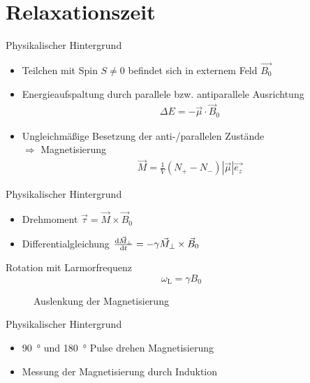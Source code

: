
\thispagestyle{empty}
\frame{\titlepage}


\section{Relaxationszeit}
\begin{frame}{Physikalischer Hintergrund}
	\begin{itemize}
	\item Teilchen mit Spin $S\neq 0$ befindet sich in externem Feld $\vec{B_{0}}$
	\item Energieaufspaltung durch parallele bzw. antiparallele Ausrichtung
		\begin{align*}
		\Delta E = -\vec{\mu}\cdot\vec{B}_0
		\end{align*}
	\item Ungleichmäßige Besetzung der anti-/parallelen Zustände\\
	 $\Rightarrow$ Magnetisierung 
		\begin{align*}
		\vec{M}=\frac{1}{V}(N_{+}-N_{-})|\vec{\mu}|\vec{e_{z}}
		\end{align*}
	\end{itemize}
\end{frame}

\begin{frame}{Physikalischer Hintergrund}
	\begin{itemize}
	\item Drehmoment $\vec{\tau}=\vec{M}\times\vec{B}_0$
	\item Differentialgleichung $\dv{\vec{M}_\bot}{t}=-\gamma\vec{M}_\bot\times\vec{B}_0$
	\end{itemize}
	\begin{block}{Rotation mit Larmorfrequenz}
		\[
		\omega_\text{L}=\gamma B_0
		\]
	\end{block}
	\begin{figure}
	
	\caption{Auslenkung der Magnetisierung}
	\end{figure}
\end{frame}

\begin{frame}{Physikalischer Hintergrund}
	\begin{itemize}
	\item \SI{90}{\degree} und \SI{180}{\degree} Pulse drehen Magnetisierung
	\item Messung der Magnetisierung durch Induktion
	\end{itemize}
\end{frame}

